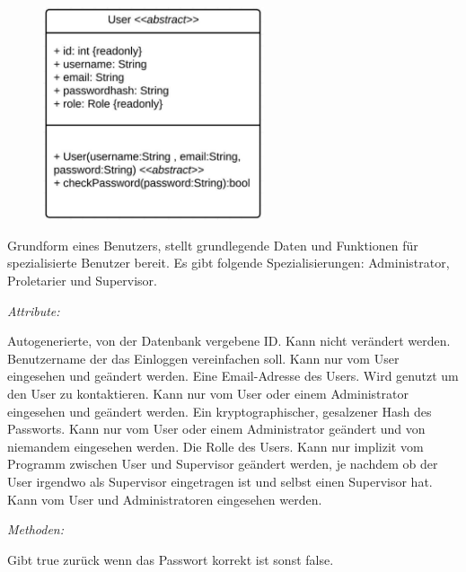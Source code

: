         \begin{itemize}
                \begin{figure}[htb]
                \centering
                \includegraphics[width=6.5cm]{Diagramms/class/singleclass/User.pdf}
                \end{figure}
                \newline
                Grundform eines Benutzers, stellt grundlegende Daten und Funktionen für spezialisierte Benutzer bereit.
                Es gibt folgende Spezialisierungen: Administrator, Proletarier und Supervisor.

                \emph{Attribute:}
                \begin{itemize}
                        Autogenerierte, von der Datenbank vergebene ID.
                        Kann nicht verändert werden.
                        Benutzername der das Einloggen vereinfachen soll.
                        Kann nur vom User eingesehen und geändert werden.
                        Eine Email-Adresse des Users.
                        Wird genutzt um den User zu kontaktieren.
                        Kann nur vom User oder einem Administrator eingesehen und geändert werden.
                        Ein kryptographischer, gesalzener Hash des Passworts.
                        Kann nur vom User oder einem Administrator geändert und von niemandem eingesehen werden.
                        Die Rolle des Users.
                        Kann nur implizit vom Programm zwischen User und Supervisor geändert werden, je nachdem ob der User irgendwo als Supervisor eingetragen ist und selbst einen Supervisor hat.
                        Kann vom User und Administratoren eingesehen werden.
                \end{itemize}
                \newpage
                \emph{Methoden:}
                \begin{itemize}
                        Gibt true zurück wenn das Passwort korrekt ist sonst false.
                \end{itemize}


\end{itemize}
